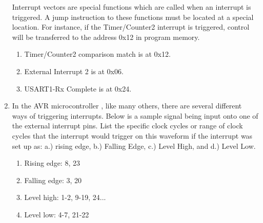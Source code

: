 \documentclass[12pt,letterpaper]{article}
\begin{document}
\begin{enumerate}
    Interrupt vectors are special functions which are called when an interrupt
is triggered. A jump instruction to these functions must be located at a special location. For instance, if the Timer/Counter2 interrupt is triggered, control will be transferred to the address 0x12 in program memory.
    \begin{enumerate}
        \item Timer/Counter2 comparison match is at 0x12.
        \item External Interrupt 2 is at 0x06.
        \item USART1-Rx Complete is at 0x24.
    \end{enumerate}

    \item In the AVR microcontroller , like many others, there are several different ways of triggering interrupts. Below is a sample signal being input onto one of the external interrupt pins.  List the specific clock cycles or range of clock cycles that the interrupt would trigger on this waveform if the interrupt was set up as: a.) rising edge, b.) Falling Edge, c.) Level High, and d.) Level Low.
    \begin{enumerate}
        \item Rising edge: 8, 23
        \item Falling edge: 3, 20
        \item Level high: 1-2, 9-19, 24...
        \item Level low: 4-7, 21-22
    \end{enumerate}
\end{enumerate} 
\end{document}
